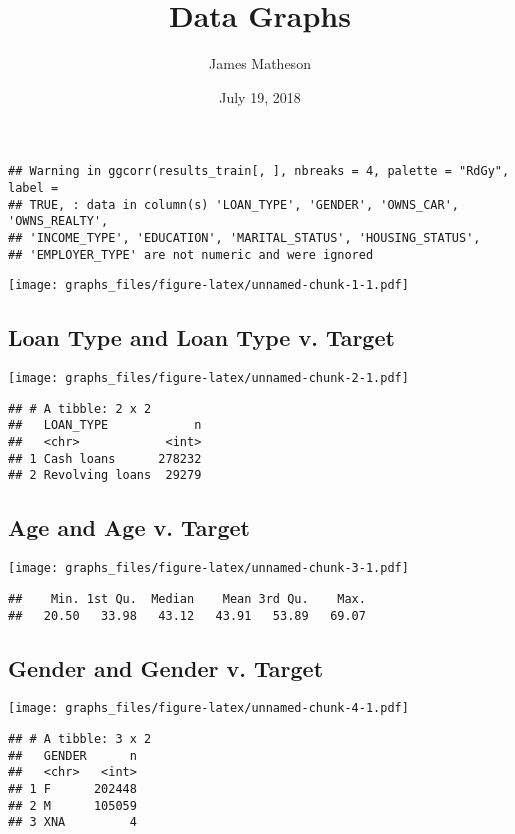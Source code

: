 \documentclass[]{article}
\title{Data Graphs}
\author{James Matheson}
\date{July 19, 2018}
\begin{document}
\maketitle

\begin{verbatim}
## Warning in ggcorr(results_train[, ], nbreaks = 4, palette = "RdGy", label =
## TRUE, : data in column(s) 'LOAN_TYPE', 'GENDER', 'OWNS_CAR', 'OWNS_REALTY',
## 'INCOME_TYPE', 'EDUCATION', 'MARITAL_STATUS', 'HOUSING_STATUS',
## 'EMPLOYER_TYPE' are not numeric and were ignored
\end{verbatim}

\texttt{[image: graphs\_files/figure-latex/unnamed-chunk-1-1.pdf]}

\subsection{Loan Type and Loan Type v.
Target}\label{loan-type-and-loan-type-v.-target}

\texttt{[image: graphs\_files/figure-latex/unnamed-chunk-2-1.pdf]}

\begin{verbatim}
## # A tibble: 2 x 2
##   LOAN_TYPE            n
##   <chr>            <int>
## 1 Cash loans      278232
## 2 Revolving loans  29279
\end{verbatim}

\subsection{Age and Age v. Target}\label{age-and-age-v.-target}

\texttt{[image: graphs\_files/figure-latex/unnamed-chunk-3-1.pdf]}

\begin{verbatim}
##    Min. 1st Qu.  Median    Mean 3rd Qu.    Max. 
##   20.50   33.98   43.12   43.91   53.89   69.07
\end{verbatim}

\subsection{Gender and Gender v.
Target}\label{gender-and-gender-v.-target}

\texttt{[image: graphs\_files/figure-latex/unnamed-chunk-4-1.pdf]}

\begin{verbatim}
## # A tibble: 3 x 2
##   GENDER      n
##   <chr>   <int>
## 1 F      202448
## 2 M      105059
## 3 XNA         4
\end{verbatim}
\end{document}
